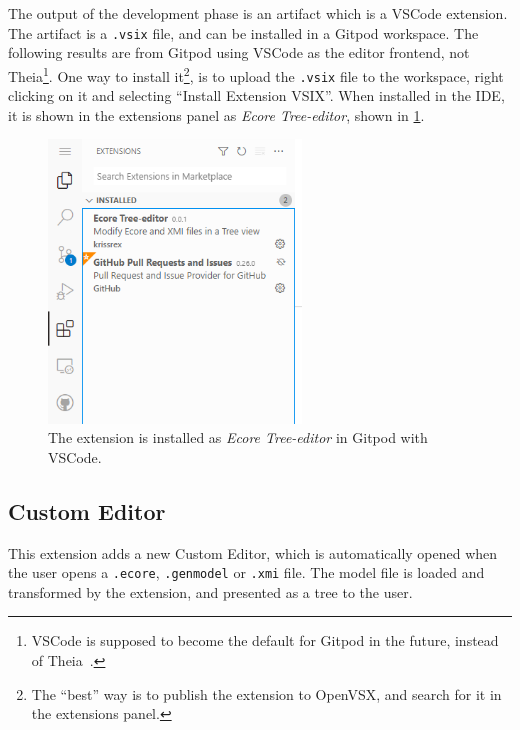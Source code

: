 The output of the development phase is an artifact which is a \gls{VSCode} extension.
The artifact is a \texttt{.vsix} file, and can be installed in a \gls{Gitpod} workspace.
The following results are from \gls{Gitpod} using \gls{VSCode} as the editor frontend, not \gls{Theia}\footnote{VSCode is supposed to become the default for Gitpod in the future, instead of Theia~\cite{georgetsiolisMenuEntryGitpod2019}.}.
One way to install it\footnote{The ``best'' way is to publish the extension to OpenVSX, and search for it in the extensions panel.}, is to upload the \texttt{.vsix} file to the workspace, right clicking on it and selecting ``Install Extension VSIX''.
When installed in the \acrshort{IDE}, it is shown in the extensions panel as \textit{Ecore Tree-editor}, shown in \cref{fig:gitpod-ext-installed}.

\begin{figure}[H]  %
  \centering
  \includegraphics[width=0.6\textwidth]{figures/gitpod-vscode-extensions-installed.png}
  \caption[Tree Editor Extension installed in Gitpod]{The extension is installed as \textit{Ecore Tree-editor} in Gitpod with VSCode.}\label{fig:gitpod-ext-installed}
\end{figure}

\subsection{Custom Editor}

This extension adds a new Custom Editor, which is automatically opened when the user opens a \texttt{.ecore}, \texttt{.genmodel} or \texttt{.xmi} file.
The model file is loaded and transformed by the extension, and presented as a tree to the user.

